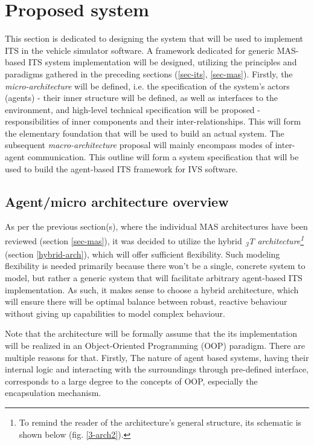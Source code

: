 \documentclass[main.tex]{subfiles}
\begin{document}
    
\section{Proposed system}\label{sec-system}

This section is dedicated to designing the system that will be used to implement ITS in the
vehicle simulator software. A framework dedicated for generic MAS-based ITS system
implementation will be designed, utilizing the principles and paradigms gathered in the
preceding sections (\ref{sec-its}, \ref{sec-mas}). Firstly, the \emph{micro-architecture} will be
defined, i.e. the specification of the system's actors (agents) - their inner structure 
will be defined, as well as interfaces to the environment, and high-level technical specification 
will be proposed - responsibilities of inner components and their inter-relationships.
This will form the elementary foundation that will be used to build an actual system.
The subsequent \emph{macro-architecture} proposal will mainly encompass modes of inter-
agent communication. This outline will form a system specification that will be used 
to build the agent-based ITS framework for IVS software.

\subsection{Agent/micro architecture overview}

As per the previous section(s), where the individual MAS architectures have been reviewed
(section \ref{sec-mas}), it was decided to utilize  the hybrid \emph{\textsubscript{3}T
architecture\footnote{To remind the reader of the architecture's general structure, its
schematic is shown below (fig. \ref{3-arch2}).}} (section \ref{hybrid-arch}), which will offer
sufficient flexibility.  Such modeling flexibility is needed primarily because there won't be a
single, concrete system to model, but rather a generic system that will facilitate arbitrary
agent-based ITS implementation. As such, it makes sense to choose a hybrid architecture, which
will ensure there will be optimal balance between robust, reactive behaviour without giving up
capabilities to model complex behaviour.

Note that the architecture will be formally assume that the its implementation will be realized 
in an Object-Oriented Programming (OOP) paradigm. There are multiple reasons for that. Firstly, 
The nature of agent based systems, having their internal logic and interacting with the surroundings 
through pre-defined interface, corresponds to a large degree to the concepts of OOP, especially
the encapsulation mechanism.
\end{document}
